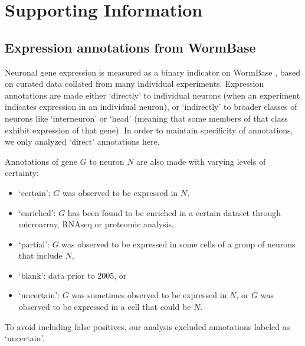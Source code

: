 \documentclass[10pt,letterpaper]{article}
\begin{document}
{%




\newpage
\section*{Supporting Information}
\setcounter{figure}{0} \renewcommand{\thefigure}{S\arabic{figure}}
\renewcommand{\thefigure}{S\arabic{figure}}
\renewcommand{\thetable}{S\arabic{table}}

\subsection*{Expression annotations from WormBase}

Neuronal gene expression is measured as a binary indicator on WormBase \cite{Harris:2009kd}, based on curated data collated from many individual experiments.
Expression annotations are made either `directly' to individual neurons (when an experiment indicates expression in an individual neuron), or `indirectly' to broader classes of neurons like `interneuron' or `head' (meaning that some members of that class exhibit expression of that gene).
In order to maintain specificity of annotations, we only analyzed `direct' annotations here.

Annotations of gene $G$ to neuron $N$ are also made with varying levels of certainty:
\begin{itemize}
    \item `certain': $G$ was observed to be expressed in $N$,
    \item `enriched': $G$ has been found to be enriched in a certain dataset through microarray, RNAseq or proteomic analysis,
    \item `partial': $G$ was observed to be expressed in some cells of a group of neurons that include $N$,
    \item `blank': data prior to 2005, or
    \item `uncertain': $G$ was sometimes observed to be expressed in $N$, or $G$ was observed to be expressed in a cell that could be $N$.
\end{itemize}
To avoid including false positives, our analysis excluded annotations labeled as `uncertain'.


}
\end{document}
